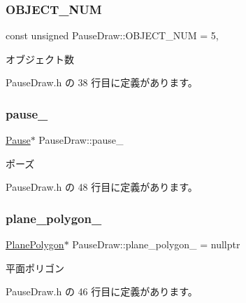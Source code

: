 \subsubsection{\texorpdfstring{O\+B\+J\+E\+C\+T\+\_\+\+N\+UM}{OBJECT\_NUM}}
{\footnotesize\ttfamily const unsigned Pause\+Draw\+::\+O\+B\+J\+E\+C\+T\+\_\+\+N\+UM = 5\hspace{0.3cm}{\ttfamily [static]}, {\ttfamily [private]}}



オブジェクト数 



 Pause\+Draw.\+h の 38 行目に定義があります。

\mbox{\label{class_pause_draw_a7ee983174375f6437d39a628fe30a750}} 
\subsubsection{\texorpdfstring{pause\+\_\+}{pause\_}}
{\footnotesize\ttfamily \mbox{\hyperlink{class_pause}{Pause}}$\ast$ Pause\+Draw\+::pause\+\_\+\hspace{0.3cm}{\ttfamily [private]}}



ポーズ 



 Pause\+Draw.\+h の 48 行目に定義があります。

\mbox{\label{class_pause_draw_ab2b509f30e00ae7c4250b0c50a21c1c6}} 
\subsubsection{\texorpdfstring{plane\+\_\+polygon\+\_\+}{plane\_polygon\_}}
{\footnotesize\ttfamily \mbox{\hyperlink{class_plane_polygon}{Plane\+Polygon}}$\ast$ Pause\+Draw\+::plane\+\_\+polygon\+\_\+ = nullptr\hspace{0.3cm}{\ttfamily [private]}}



平面ポリゴン 



 Pause\+Draw.\+h の 46 行目に定義があります。

